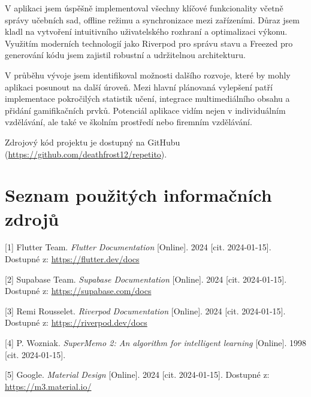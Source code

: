 \documentclass[12pt, a4paper, twoside, openright]{report}
\begin{document}
	V aplikaci jsem úspěšně implementoval všechny klíčové funkcionality včetně správy učebních sad, offline režimu a synchronizace mezi zařízeními. Důraz jsem kladl na vytvoření intuitivního uživatelského rozhraní a optimalizaci výkonu. Využitím moderních technologií jako Riverpod pro správu stavu a Freezed pro generování kódu jsem zajistil robustní a udržitelnou architekturu.

	V průběhu vývoje jsem identifikoval možnosti dalšího rozvoje, které by mohly aplikaci posunout na další úroveň. Mezi hlavní plánovaná vylepšení patří implementace pokročilých statistik učení, integrace multimediálního obsahu a přidání gamifikačních prvků. Potenciál aplikace vidím nejen v individuálním vzdělávání, ale také ve školním prostředí nebo firemním vzdělávání.

	Zdrojový kód projektu je dostupný na GitHubu (\url{https://github.com/deathfrost12/repetito}).

\chapter*{Seznam použitých informačních zdrojů}

[1] Flutter Team. \textit{Flutter Documentation} [Online]. 2024 [cit. 2024-01-15]. Dostupné z: \url{https://flutter.dev/docs}

[2] Supabase Team. \textit{Supabase Documentation} [Online]. 2024 [cit. 2024-01-15]. Dostupné z: \url{https://supabase.com/docs}

[3] Remi Rousselet. \textit{Riverpod Documentation} [Online]. 2024 [cit. 2024-01-15]. Dostupné z: \url{https://riverpod.dev/docs}

[4] P. Wozniak. \textit{SuperMemo 2: An algorithm for intelligent learning} [Online]. 1998 [cit. 2024-01-15].

[5] Google. \textit{Material Design} [Online]. 2024 [cit. 2024-01-15]. Dostupné z: \url{https://m3.material.io/}
\end{document}
